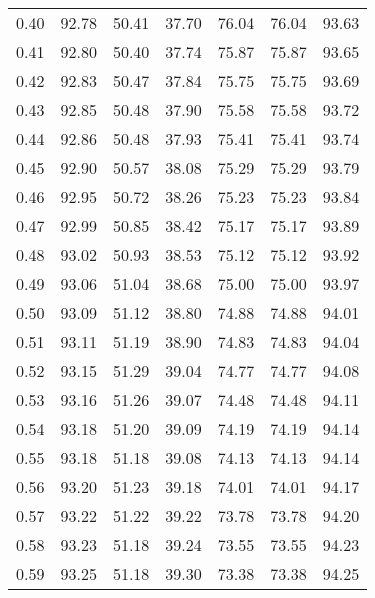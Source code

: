 \begin{tabular}{|c|c|c|c|c|c|c|}
      0.40 &     92.78 &     50.41 &      37.70 &   76.04 &      76.04 &         93.63 \\
      0.41 &     92.80 &     50.40 &      37.74 &   75.87 &      75.87 &         93.65 \\
      0.42 &     92.83 &     50.47 &      37.84 &   75.75 &      75.75 &         93.69 \\
      0.43 &     92.85 &     50.48 &      37.90 &   75.58 &      75.58 &         93.72 \\
      0.44 &     92.86 &     50.48 &      37.93 &   75.41 &      75.41 &         93.74 \\
      0.45 &     92.90 &     50.57 &      38.08 &   75.29 &      75.29 &         93.79 \\
      0.46 &     92.95 &     50.72 &      38.26 &   75.23 &      75.23 &         93.84 \\
      0.47 &     92.99 &     50.85 &      38.42 &   75.17 &      75.17 &         93.89 \\
      0.48 &     93.02 &     50.93 &      38.53 &   75.12 &      75.12 &         93.92 \\
      0.49 &     93.06 &     51.04 &      38.68 &   75.00 &      75.00 &         93.97 \\
      0.50 &     93.09 &     51.12 &      38.80 &   74.88 &      74.88 &         94.01 \\
      0.51 &     93.11 &     51.19 &      38.90 &   74.83 &      74.83 &         94.04 \\
      0.52 &     93.15 &     51.29 &      39.04 &   74.77 &      74.77 &         94.08 \\
      0.53 &     93.16 &     51.26 &      39.07 &   74.48 &      74.48 &         94.11 \\
      0.54 &     93.18 &     51.20 &      39.09 &   74.19 &      74.19 &         94.14 \\
      0.55 &     93.18 &     51.18 &      39.08 &   74.13 &      74.13 &         94.14 \\
      0.56 &     93.20 &     51.23 &      39.18 &   74.01 &      74.01 &         94.17 \\
      0.57 &     93.22 &     51.22 &      39.22 &   73.78 &      73.78 &         94.20 \\
      0.58 &     93.23 &     51.18 &      39.24 &   73.55 &      73.55 &         94.23 \\
      0.59 &     93.25 &     51.18 &      39.30 &   73.38 &      73.38 &         94.25 \\

\end{tabular}
